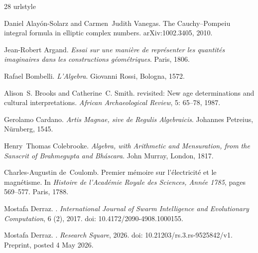\documentclass[11pt,a4paper]{amsart}
\theoremstyle{plain}
\theoremstyle{definition}
\theoremstyle{remark}
\begin{document}
\begin{thebibliography}{28}
\providecommand{\natexlab}[1]{#1}
\providecommand{\url}[1]{\texttt{#1}}
\expandafter\ifx\csname urlstyle\endcsname\relax
  \providecommand{\doi}[1]{doi: #1}\else
  \providecommand{\doi}{doi: \begingroup \urlstyle{rm}\Url}\fi

Daniel Alay{\'o}n-Solarz and Carmen~Judith Vanegas.
\newblock The {Cauchy--Pompeiu} integral formula in elliptic complex numbers.
\newblock arXiv:1002.3405, 2010.

Jean-Robert Argand.
\newblock \emph{Essai sur une mani{\`e}re de repr{\'e}senter les quantit{\'e}s
  imaginaires dans les constructions g{\'e}om{\'e}triques}.
\newblock Paris, 1806.

Rafael Bombelli.
\newblock \emph{L'Algebra}.
\newblock Giovanni Rossi, Bologna, 1572.

Alison~S. Brooks and Catherine~C. Smith.
 revisited: New age determinations and cultural
  interpretations.
\newblock \emph{African Archaeological Review}, 5: 65--78, 1987.

Gerolamo Cardano.
\newblock \emph{Artis Magnae, sive de Regulis Algebraicis}.
\newblock Johannes Petreius, N{\"u}rnberg, 1545.

Henry~Thomas Colebrooke.
\newblock \emph{Algebra, with Arithmetic and Mensuration, from the Sanscrit of
  Brahmegupta and Bh{\'a}scara}.
\newblock John Murray, London, 1817.

Charles-Augustin de~Coulomb.
\newblock Premier m{\'e}moire sur l'{\'e}lectricit{\'e} et le magn{\'e}tisme.
\newblock In \emph{Histoire de l'Acad{\'e}mie Royale des Sciences, Ann{\'e}e
  1785}, pages 569--577. Paris, 1788.

Mostafa Derraz.
.
\newblock \emph{International Journal of Swarm Intelligence and Evolutionary
  Computation}, 6 (2), 2017.
\newblock \doi{10.4172/2090-4908.1000155}.

Mostafa Derraz.
.
\newblock \emph{Research Square}, 2026.
\newblock \doi{10.21203/rs.3.rs-9525842/v1}.
\newblock Preprint, posted 4 May 2026.


\end{thebibliography}
\end{document}
